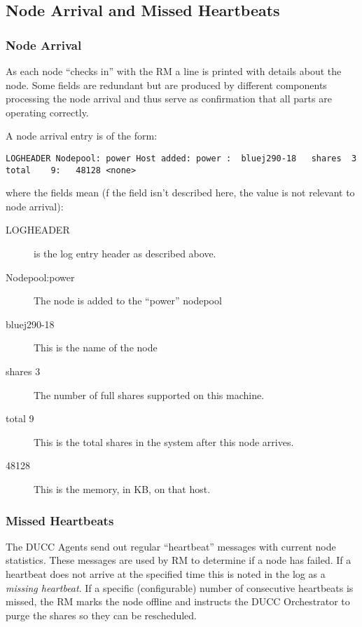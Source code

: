 \subsection{Node Arrival and Missed Heartbeats}
\subsubsection{Node Arrival}
    As each node ``checks in'' with the RM a line is printed with details about the node.  Some fields
    are redundant but are produced by different components processing the node arrival and thus serve
    as confirmation that all parts are operating correctly.

    A node arrival entry is of the form:
\begin{verbatim}
LOGHEADER Nodepool: power Host added: power :  bluej290-18   shares  3 total    9:   48128 <none>
\end{verbatim}
    where the fields mean (f the field isn't described here, the value is not relevant to node arrival):
    \begin{description}
      \item[LOGHEADER] is the log entry header as described above.
      \item[Nodepool:power] The node is added to the ``power'' nodepool
      \item[bluej290-18] This is the name of the node
      \item[shares 3] The number of full shares supported on this machine.
      \item[total 9] This is the total shares in the system after this node arrives.
      \item[48128] This is the memory, in KB, on that host.
    \end{description}

\subsubsection{Missed Heartbeats}
    The DUCC Agents send out regular ``heartbeat'' messages with current node statistics. These
    messages are used by RM to determine if a node has failed.  If a heartbeat does not arrive
    at the specified time this is noted in the log as a {\em missing heartbeat}. If a specific (configurable) number
    of consecutive heartbeats is missed, the RM marks the node offline and instructs the
    DUCC Orchestrator to purge the shares so they can be rescheduled.

